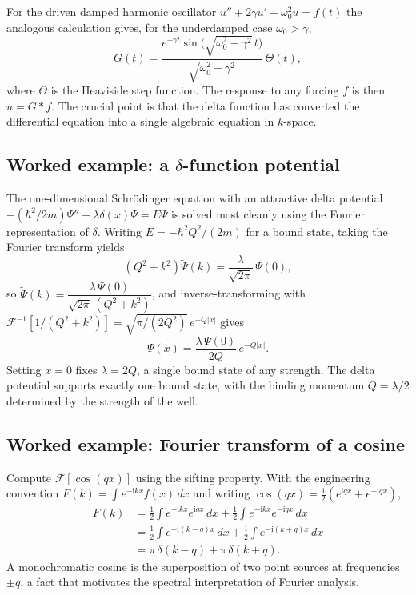 For the driven damped harmonic oscillator $u''+2\gamma u'+\omega_0^2 u=f(t)$ the analogous calculation gives, for the underdamped case $\omega_0>\gamma$,
\begin{equation}
G(t)=\frac{e^{-\gamma t}\sin\!\bigl(\sqrt{\omega_0^2-\gamma^2}\,t\bigr)}{\sqrt{\omega_0^2-\gamma^2}}\,\Theta(t),
\end{equation}
where $\Theta$ is the Heaviside step function. The response to any forcing $f$ is then $u=G*f$. The crucial point is that the delta function has converted the differential equation into a single algebraic equation in $k$-space.

\subsection{Worked example: a $\delta$-function potential}

The one-dimensional Schr\"odinger equation with an attractive delta potential $-(\hbar^2/2m)\Psi''-\lambda\delta(x)\Psi=E\Psi$ is solved most cleanly using the Fourier representation of $\delta$. Writing $E=-\hbar^2Q^2/(2m)$ for a bound state, taking the Fourier transform yields
\begin{equation}
(Q^2+k^2)\widetilde\Psi(k)=\frac{\lambda}{\sqrt{2\pi}}\,\Psi(0),
\end{equation}
so $\widetilde\Psi(k)=\dfrac{\lambda\,\Psi(0)}{\sqrt{2\pi}\,(Q^2+k^2)}$, and inverse-transforming with $\mathcal{F}^{-1}[1/(Q^2+k^2)]=\sqrt{\pi/(2Q^2)}\,e^{-Q|x|}$ gives
\begin{equation}
\Psi(x)=\frac{\lambda\,\Psi(0)}{2Q}\,e^{-Q|x|}.
\end{equation}
Setting $x=0$ fixes $\lambda=2Q$, a single bound state of any strength. The delta potential supports exactly one bound state, with the binding momentum $Q=\lambda/2$ determined by the strength of the well.

\subsection{Worked example: Fourier transform of a cosine}

Compute $\mathcal{F}[\cos(qx)]$ using the sifting property. With the engineering convention $F(k)=\int e^{-\mathrm{i}kx}f(x)\,dx$ and writing $\cos(qx)=\tfrac12(e^{\mathrm{i}qx}+e^{-\mathrm{i}qx})$,
\begin{align}
F(k)&=\tfrac12\int e^{-\mathrm{i}kx}e^{\mathrm{i}qx}\,dx+\tfrac12\int e^{-\mathrm{i}kx}e^{-\mathrm{i}qx}\,dx\\
&=\tfrac12\!\int\!e^{-\mathrm{i}(k-q)x}\,dx+\tfrac12\!\int\!e^{-\mathrm{i}(k+q)x}\,dx\\
&=\pi\,\delta(k-q)+\pi\,\delta(k+q).
\end{align}
A monochromatic cosine is the superposition of two point sources at frequencies $\pm q$, a fact that motivates the spectral interpretation of Fourier analysis.
